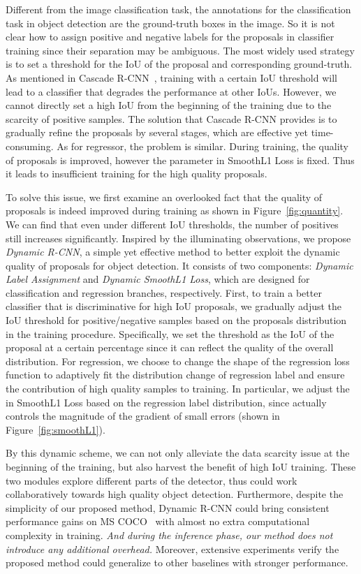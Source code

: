 \documentclass[runningheads]{llncs}
\begin{document}
Different from the image classification task, the annotations for the classification task in object detection are the ground-truth boxes in the image. So it is not clear how to assign positive and negative labels for the proposals in classifier training since their separation may be ambiguous. The most widely used strategy is to set a threshold for the IoU of the proposal and corresponding ground-truth. As mentioned in Cascade R-CNN~\cite{CascadeRCNN}, training with a certain IoU threshold will lead to a classifier that degrades the performance at other IoUs. However, we cannot directly set a high IoU from the beginning of the training due to the scarcity of positive samples. The solution that Cascade R-CNN provides is to gradually refine the proposals by several stages, which are effective yet time-consuming. As for regressor, the problem is similar. During training, the quality of proposals is improved, however the parameter in SmoothL1 Loss is fixed. Thus it leads to insufficient training for the high quality proposals.

To solve this issue, we first examine an overlooked fact that the quality of proposals is indeed improved during training as shown in Figure~\ref{fig:quantity}. We can find that even under different IoU thresholds, the number of positives still increases significantly.
Inspired by the illuminating observations, we propose \textit{Dynamic R-CNN}, a simple yet effective method to better exploit the dynamic quality of proposals for object detection. It consists of two components: \textit{Dynamic Label Assignment} and \textit{Dynamic SmoothL1 Loss}, which are designed for classification and regression branches, respectively.
First, to train a better classifier that is discriminative for high IoU proposals, we gradually adjust the IoU threshold for positive/negative samples based on the proposals distribution in the training procedure. Specifically, we set the threshold as the IoU of the proposal at a certain percentage since it can reflect the quality of the overall distribution.
For regression, we choose to change the shape of the regression loss function to adaptively fit the distribution change of regression label and ensure the contribution of high quality samples to training. In particular, we adjust the  in SmoothL1 Loss based on the regression label distribution, since  actually controls the magnitude of the gradient of small errors (shown in Figure~\ref{fig:smoothL1}).

By this dynamic scheme, we can not only alleviate the data scarcity issue at the beginning of the training, but also harvest the benefit of high IoU training.
These two modules explore different parts of the detector, thus could work collaboratively towards high quality object detection.
Furthermore, despite the simplicity of our proposed method, Dynamic R-CNN could bring consistent performance gains on MS COCO~\cite{COCO} with almost no extra computational complexity in training. \emph{And during the inference phase, our method does not introduce any additional overhead.}  Moreover, extensive experiments verify the proposed method could generalize to other baselines with stronger performance.
\end{document}
